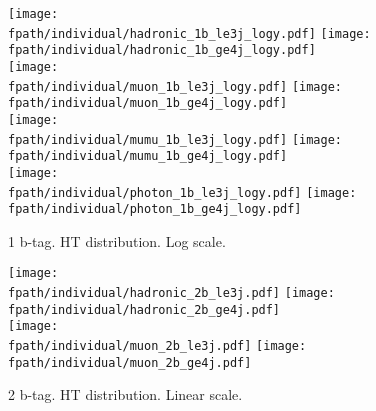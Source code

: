 \documentclass[11pt,a4paper]{article}
\def\fpath{/home/hep/elaird1/public_html/119_2012_categories/v7/}
\begin{document}

\begin{figure}
\begin{center}
\texttt{[image: \\fpath/individual/hadronic\_1b\_le3j\_logy.pdf]}
\texttt{[image: \\fpath/individual/hadronic\_1b\_ge4j\_logy.pdf]}\\
\texttt{[image: \\fpath/individual/muon\_1b\_le3j\_logy.pdf]}
\texttt{[image: \\fpath/individual/muon\_1b\_ge4j\_logy.pdf]}\\
\texttt{[image: \\fpath/individual/mumu\_1b\_le3j\_logy.pdf]}
\texttt{[image: \\fpath/individual/mumu\_1b\_ge4j\_logy.pdf]}\\
\texttt{[image: \\fpath/individual/photon\_1b\_le3j\_logy.pdf]}
\texttt{[image: \\fpath/individual/photon\_1b\_ge4j\_logy.pdf]}\\
\caption{1 b-tag. HT distribution. Log scale.}
\end{center}
\end{figure}

\begin{figure}
\begin{center}
\texttt{[image: \\fpath/individual/hadronic\_2b\_le3j.pdf]}
\texttt{[image: \\fpath/individual/hadronic\_2b\_ge4j.pdf]}\\
\texttt{[image: \\fpath/individual/muon\_2b\_le3j.pdf]}
\texttt{[image: \\fpath/individual/muon\_2b\_ge4j.pdf]}\\
\caption{2 b-tag. HT distribution. Linear scale.}
\end{center}
\end{figure}

\end{document}
